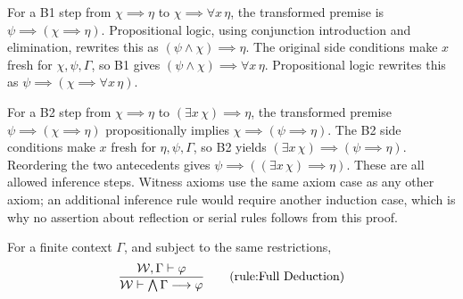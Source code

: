 For a B1 step from $\chi\implies\eta$ to
$\chi\implies\forall x\,\eta$, the transformed premise is
$\psi\implies(\chi\implies\eta)$. Propositional logic, using
conjunction introduction and elimination, rewrites this as
$(\psi\land\chi)\implies\eta$. The original side conditions make
$x$ fresh for $\chi,\psi,\Gamma$, so B1 gives
$(\psi\land\chi)\implies\forall x\,\eta$. Propositional logic
rewrites this as $\psi\implies(\chi\implies\forall x\,\eta)$.

For a B2 step from $\chi\implies\eta$ to
$(\exists x\,\chi)\implies\eta$, the transformed premise
$\psi\implies(\chi\implies\eta)$ propositionally implies
$\chi\implies(\psi\implies\eta)$. The B2 side conditions make $x$
fresh for $\eta,\psi,\Gamma$, so B2 yields
$(\exists x\,\chi)\implies(\psi\implies\eta)$. Reordering the two
antecedents gives $\psi\implies((\exists x\,\chi)\implies\eta)$.
These are all allowed inference steps. Witness axioms use the same
axiom case as any other axiom; an additional inference rule would require
another induction case, which is why no assertion about reflection or
serial rules follows from this proof.
\Done

For a finite context $\Gamma$, and subject to the same restrictions,
\[
\frac{
\Wau,\Gamma \vdash \phi
}{
\Wau \vdash\bigwedge\Gamma\implies\phi
}
\labeltagd{rule}{Full Deduction}
\]


